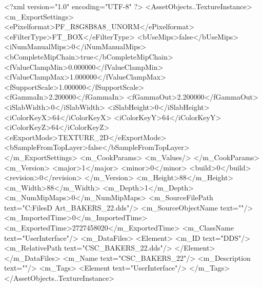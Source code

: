 <?xml version="1.0" encoding="UTF-8" ?>
<AssetObjects..TextureInstance>
	<m_ExportSettings>
		<ePixelformat>PF_R8G8B8A8_UNORM</ePixelformat>
		<eFilterType>FT_BOX</eFilterType>
		<bUseMips>false</bUseMips>
		<iNumManualMips>0</iNumManualMips>
		<bCompleteMipChain>true</bCompleteMipChain>
		<fValueClampMin>0.000000</fValueClampMin>
		<fValueClampMax>1.000000</fValueClampMax>
		<fSupportScale>1.000000</fSupportScale>
		<fGammaIn>2.200000</fGammaIn>
		<fGammaOut>2.200000</fGammaOut>
		<iSlabWidth>0</iSlabWidth>
		<iSlabHeight>0</iSlabHeight>
		<iColorKeyX>64</iColorKeyX>
		<iColorKeyY>64</iColorKeyY>
		<iColorKeyZ>64</iColorKeyZ>
		<eExportMode>TEXTURE_2D</eExportMode>
		<bSampleFromTopLayer>false</bSampleFromTopLayer>
	</m_ExportSettings>
	<m_CookParams>
		<m_Values/>
	</m_CookParams>
	<m_Version>
		<major>1</major>
		<minor>0</minor>
		<build>0</build>
		<revision>0</revision>
	</m_Version>
	<m_Height>88</m_Height>
	<m_Width>88</m_Width>
	<m_Depth>1</m_Depth>
	<m_NumMipMaps>0</m_NumMipMaps>
	<m_SourceFilePath text="C:\Users\Shadow\Desktop\Working Files\2D Art\Quarters\Bakers\CSC_BAKERS_22.dds"/>
	<m_SourceObjectName text=""/>
	<m_ImportedTime>0</m_ImportedTime>
	<m_ExportedTime>2727458020</m_ExportedTime>
	<m_ClassName text="UserInterface"/>
	<m_DataFiles>
		<Element>
			<m_ID text="DDS"/>
			<m_RelativePath text="CSC_BAKERS_22.dds"/>
		</Element>
	</m_DataFiles>
	<m_Name text="CSC_BAKERS_22"/>
	<m_Description text=""/>
	<m_Tags>
		<Element text="UserInterface"/>
	</m_Tags>
</AssetObjects..TextureInstance>

